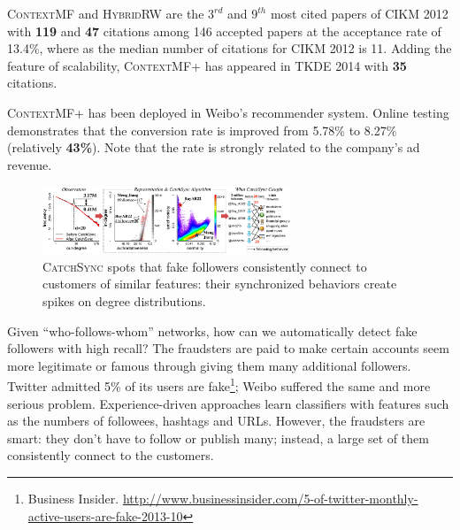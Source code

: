 \documentclass[10.5pt]{article}
\begin{document}
\begin{compactitem}
\item \textsc{ContextMF} \cite{jiang2012socialcontextual} and \textsc{HybridRW} \cite{jiang2012socialrecommendation} are the $3^{rd}$ and $9^{th}$ most cited papers of CIKM 2012 with \textbf{119} and \textbf{47} citations among 146 accepted papers at the acceptance rate of 13.4\%, where as the median number of citations for CIKM 2012 is 11. Adding the feature of scalability, \textsc{ContextMF+} \cite{jiang2014scalable} has appeared in TKDE 2014 with \textbf{35} citations.
\item \textsc{ContextMF+} has been deployed in Weibo's recommender system. Online testing demonstrates that the conversion rate is improved from 5.78\% to 8.27\% (relatively \textbf{43\%}). Note that the rate is strongly related to the company's ad revenue.
\end{compactitem}

\vskip 0.03in


\begin{figure}
\vskip -0.12in
\includegraphics[width=0.66\textwidth]{figure/catchsync.pdf}
\vskip -0.18in
\caption{\textsc{CatchSync} \cite{jiang2014catchsync} spots that fake followers consistently connect to customers of similar features: their synchronized behaviors create spikes on degree distributions.}
\label{fig:catchsync}
\vskip -0.12in
\end{figure}

Given ``who-follows-whom'' networks, how can we automatically detect fake followers with high recall? The fraudsters are paid to make certain accounts seem more legitimate or famous through giving them many additional followers. Twitter admitted 5\% of its users are fake\footnote{Business Insider. \url{http://www.businessinsider.com/5-of-twitter-monthly-active-users-are-fake-2013-10}}; Weibo suffered the same and more serious problem. Experience-driven approaches learn classifiers with features such as the numbers of followees, hashtags and URLs. However, the fraudsters are smart: they don't have to follow or publish many; instead, a large set of them consistently connect to the customers.
\end{document}
